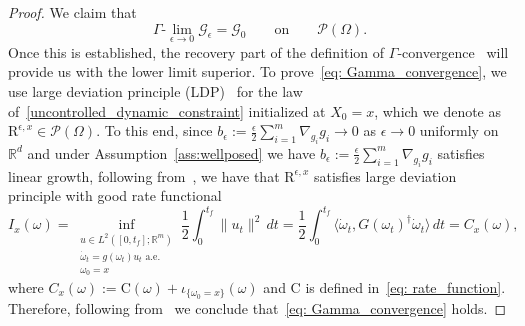 \documentclass{amsart}
\numberwithin{equation}{section}
\begin{document}
\begin{proof}
We claim that 
\begin{equation}\label{eq: Gamma_convergence}
\Gamma\text{-}\lim_{\epsilon \rightarrow 0} \mathcal G_{\epsilon}= \mathcal G_0   \qquad\text{on}\qquad\mathcal P(\Omega).
\end{equation}
Once this is established, the recovery part of the definition of $\Gamma$-convergence~\cite{dal2012introduction} will provide us with the lower limit superior. To prove~\eqref{eq: Gamma_convergence}, we use large deviation principle (LDP)~\cite{DemboZeitouni1998,DupuisEllis1997} for  the law of~\eqref{uncontrolled_dynamic_constraint} initialized at $X_{0}=x$, which we denote as $\mathrm{R}^{\epsilon,x}\in\mathcal P(\Omega)$. To this end, since $b_{\epsilon} :=\frac\epsilon2\sum_{i=1}^{m}\nabla_{g_i}g_i\rightarrow 0$ as $\epsilon\rightarrow0$  uniformly on $\mathbb{R}^d$ and under Assumption~\ref{ass:wellposed} we have $b_{\epsilon} :=\frac\epsilon2\sum_{i=1}^{m}\nabla_{g_i}g_i$ satisfies linear growth,  following from~\cite[Theorem~3.1]{ChiariniFischer2014}, we have that $\mathrm{R}^{\epsilon,x}$ satisfies large deviation principle with good rate functional
\[
I_x(\omega) = \inf_{\substack{ u \in L^2([0,t_f]; \mathbb{R}^m) \\ \dot{\omega}_t = g(\omega_t) u_t \text{ a.e.} \\ \omega_0 = x }} \frac12 \int_0^{t_f} \|u_t\|^2 \, dt=\frac12 \int_0^{t_f} \langle \dot{\omega}_t, G(\omega_t)^\dagger \dot{\omega}_t \rangle \, dt=  C_x(\omega),
\] 
where $C_x(\omega):= \mathrm{C}(\omega) + \iota_{\{\omega_0 = x\}}(\omega)$ and $\mathrm{C}$ is defined in~\eqref{eq: rate_function}. Therefore, following from~\cite[Proposition~2.5 and Proof of Theorem~6.1]{Leonard2012} we conclude that~\eqref{eq: Gamma_convergence} holds. 


\end{proof}
\end{document}
